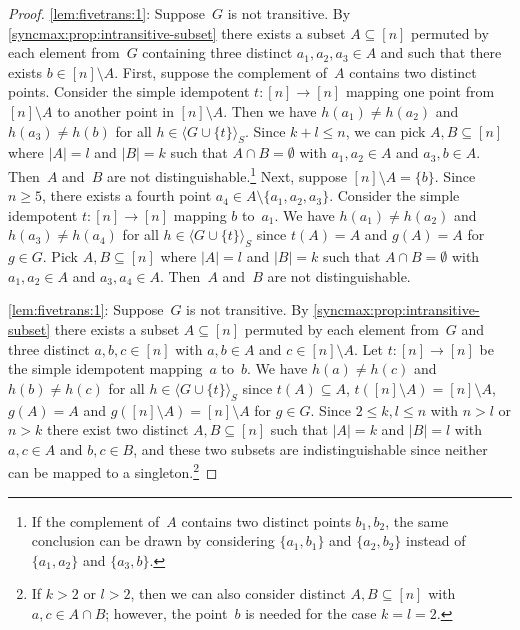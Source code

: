 \begin{proof}
\ref{lem:fivetrans:1}: Suppose~$G$ is not transitive. By \cref{syncmax:prop:intransitive-subset} there exists a subset $A \subseteq [n]$
 permuted by each element from~$G$ containing three distinct $a_1, a_2, a_3 \in A$
 and such that there exists $b \in [n] \setminus A$. 
 First, suppose the complement of~$A$ contains two distinct points.
 Consider the simple idempotent $t \colon [n] \to [n]$
 mapping one point from $[n] \setminus A$
 to another point in $[n] \setminus A$.
 Then we have $h(a_1) \ne h(a_2)$
 and $h(a_3) \ne h(b)$ for all $h\in \langle G \cup \{t\} \rangle_S$.
 Since $k + l \le n$, we can pick $A, B \subseteq [n]$ where $|A| = l$ and $|B| = k$ such that $A \cap B = \emptyset$
 with $a_1, a_2 \in A$ and $a_3, b \in A$.
 Then~$A$ and~$B$ are not distinguishable.\footnote{If the complement of~$A$ contains two distinct points $b_1, b_2$, the same conclusion can be drawn by considering $\{a_1, b_1\}$ and $\{a_2, b_2\}$ instead of $\{a_1, a_2\}$ and $\{a_3, b\}$.}
 Next, suppose $[n] \setminus A = \{b\}$.
 Since~$n \ge 5$, there exists a fourth point $a_4 \in A \setminus\{a_1, a_2, a_3\}$.
 Consider the simple idempotent $t \colon [n] \to [n]$
 mapping $b$ to~$a_1$.
 We have $h(a_1) \ne h(a_2)$
 and $h(a_3) \ne h(a_4)$ for all $h\in \langle G \cup \{t\} \rangle_S$
 since $t(A) = A$ and $g(A) = A$ for $g \in G$.
 Pick $A, B \subseteq [n]$ where $|A| = l$ and $|B| = k$ such that $A \cap B = \emptyset$
 with $a_1, a_2 \in A$ and $a_3, a_4 \in A$.
 Then~$A$ and~$B$ are not distinguishable.
 
\ref{lem:fivetrans:1}: Suppose~$G$ is not transitive. By \cref{syncmax:prop:intransitive-subset} 
  there exists a subset $A \subseteq [n]$
  permuted by each element from~$G$
  and three distinct $a,b,c \in [n]$ with $a,b \in A$ and $c \in [n] \setminus A$.
  Let $t \colon [n] \to [n]$ be the simple idempotent mapping~$a$ to~$b$.
  We have $h(a) \ne h(c)$
  and $h(b) \ne h(c)$ for all $h \in \langle G \cup \{t\} \rangle_S$
  since $t(A) \subseteq A$, $t([n] \setminus A) = [n] \setminus A$, $g(A) = A$
  and $g([n] \setminus A) = [n] \setminus A$ for $g \in G$.
  Since $2 \le k,l \le n$ with $n > l$ or $n > k$ there 
  exist two distinct $A,B \subseteq [n]$ such that $|A| = k$ and $|B| = l$
  with $a,c \in A$ and $b,c \in B$,
  and these two subsets are indistinguishable
  since neither can be mapped to a singleton.\footnote{If $k > 2$
  	or $l > 2$, then we can also consider distinct $A, B \subseteq [n]$
  	with $a,c \in A \cap B$; however, the point~$b$
  	is needed for the case $k = l = 2$.}
\end{proof}

